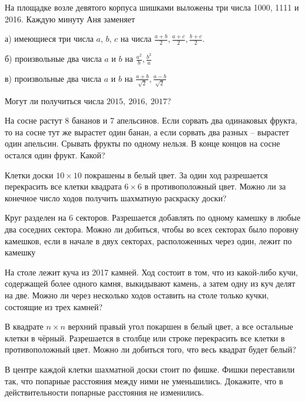 \begin{problems}

\item На площадке возле девятого корпуса шишками выложены три числа 1000, 1111 и 2016. Каждую минуту Аня заменяет
    
а) имеющиеся три числа $a$, $b$, $c$ на числа $\frac{a+b}{2}, \frac{a+c}{2}, \frac{b+c}{2}.$

б) произвольные два числа $a$ и $b$ на $\frac{a^2}{b}, \frac{b^2}{a}$

в) произвольные два числа $a$ и $b$ на $\frac{a+b}{\sqrt{2}}, \frac{a-b}{\sqrt{2}}$

Могут ли получиться числа $2015,~2016,~2017$?

\item  На сосне растут 8 бананов и 7 апельсинов. Если сорвать два одинаковых фрукта, то на сосне тут же вырастет один банан, а если сорвать два разных – вырастет один апельсин. Срывать фрукты по одному нельзя. В конце концов на сосне остался один фрукт. Какой?

\item
Клетки доски $10 \times 10$ покрашены в белый цвет. За один ход разрешается перекрасить все клетки квадрата $6 \times 6$ в противоположный цвет. Можно ли за конечное число ходов получить шахматную раскраску доски?

\item Круг разделен на 6 секторов. Разрешается добавлять по одному камешку в любые два соседних сектора. Можно ли добиться, чтобы во всех секторах было поровну камешков, если в начале в двух секторах, расположенных через один, лежит по камешку
     
    
\item На столе лежит куча из 2017 камней. Ход состоит в том, что из какой-либо кучи, содержащей более одного камня, выкидывают камень, а затем одну из куч делят на две. Можно ли через несколько ходов оставить на столе только кучки, состоящие из трех камней? 

\item
В квадрате $n \times n$ верхний правый угол покаршен в белый цвет, а все остальные клетки в чёрный. Разрешается в столбце или строке перекрасить все клетки в противоположный цвет. Можно ли добиться того, что весь квадрат будет белый?
    
\item В центре каждой клетки шахматной доски стоит по фишке. Фишки переставили так, что попарные расстояния между ними не уменьшились. Докажите, что в действительности попарные расстояния не изменились.
    

\end{problems}
